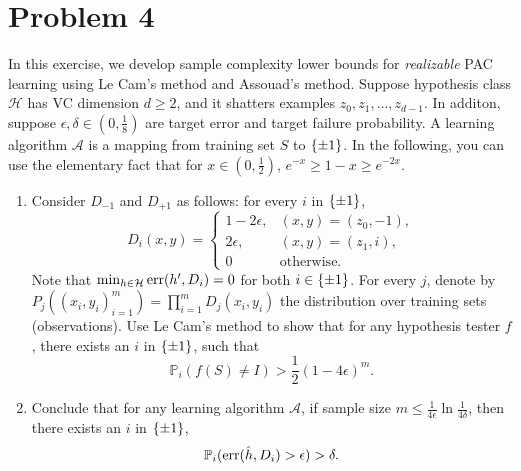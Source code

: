 \documentclass{article}
\DeclareMathOperator*{\err}{{\rm err}}
\DeclareMathOperator*{\U}{{\rm U}}
\newcommand{\PP}{\mathbb{P}} %
\newcommand{\Acal}{\mathcal{A}} %
\newcommand{\Hcal}{\mathcal{H}} %
\begin{document}
\section*{Problem 4}
In this exercise, we develop sample complexity lower bounds for {\em realizable} PAC learning using Le Cam's method and Assouad's method. Suppose hypothesis class $\Hcal$ has VC dimension $d \geq 2$, and it shatters examples $z_0, z_1, \ldots, z_{d-1}$. In additon, suppose $\epsilon, \delta \in (0,\frac18)$ are target error and target failure probability.
A learning algorithm $\Acal$ is a mapping from training set $S$ to $\cbr{\pm 1}$.
In the following, you can use the elementary fact that for $x \in (0,\frac12)$, $e^{-x} \geq 1-x \geq e^{-2x}$.


\begin{enumerate}
\item Consider $D_{-1}$ and $D_{+1}$ as follows: for every $i$ in $\cbr{\pm 1}$,
\[ D_{i}(x,y) = \begin{cases} 1-2\epsilon, & (x,y) = (z_0, -1), \\
                                2\epsilon, & (x,y) = (z_1, i), \\
                                0 & \text{otherwise.} \end{cases}  \]
Note that $\min_{h \in \Hcal} \err(h', D_i) = 0$ for both $i \in \cbr{\pm 1}$.
For every $j$, denote by $P_{j}((x_i,y_i)_{i=1}^m) = \prod_{i=1}^m D_{j}(x_i, y_i)$ the distribution over training sets (observations).
Use Le Cam's method to show that for any hypothesis tester $f$, there exists an $i$
in $\cbr{\pm 1}$, such that
\[ \PP_i( f(S) \neq I ) > \frac12 (1-4\epsilon)^m. \]



\item Conclude that for any learning algorithm $\Acal$, if sample size $m \leq \frac{1}{4\epsilon}\ln\frac1{4\delta}$, then there exists an $i$ in $\cbr{\pm 1}$,
\[ \PP_i( \err(\hat{h}, D_i) > \epsilon) > \delta. \]


\end{enumerate}
\end{document}
